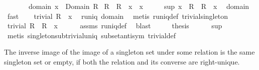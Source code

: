 \begin{isabellebody}
\ \ \ \ \ \ \ domain{\isacharcolon}\ {\isachardoublequoteopen}x\ {\isasymin}\ Domain\ R{\isachardoublequoteclose}\isanewline
{}\ {\isachardoublequoteopen}R{\isasyminverse}\ {\isacharbackquote}{\isacharbackquote}\ R\ {\isacharbackquote}{\isacharbackquote}\ {\isacharbraceleft}x{\isacharbraceright}\ {\isacharequal}\ {\isacharbraceleft}x{\isacharbraceright}{\isachardoublequoteclose}\isanewline
%
\isadelimproof
%
\endisadelimproof
%
\isatagproof
{}\isamarkupfalse%
\ {\isacharminus}\isanewline
\ \ \isamarkupfalse%
\ sup{\isacharcolon}\ {\isachardoublequoteopen}{\isacharbraceleft}x{\isacharbraceright}\ {\isasymsubseteq}\ R{\isasyminverse}\ {\isacharbackquote}{\isacharbackquote}\ R\ {\isacharbackquote}{\isacharbackquote}\ {\isacharbraceleft}x{\isacharbraceright}{\isachardoublequoteclose}\ \isamarkupfalse%
\ domain\ \isamarkupfalse%
\ fast\isanewline
\ \ \isamarkupfalse%
\ {\isachardoublequoteopen}trivial\ {\isacharparenleft}R\ {\isacharbackquote}{\isacharbackquote}\ {\isacharbraceleft}x{\isacharbraceright}{\isacharparenright}{\isachardoublequoteclose}\ \isamarkupfalse%
\ runiq\ domain\ \isamarkupfalse%
\ {\isacharparenleft}metis\ runiq{\isacharunderscore}def\ trivial{\isacharunderscore}singleton{\isacharparenright}\isanewline
\ \ \isamarkupfalse%
\ \isamarkupfalse%
\ {\isachardoublequoteopen}trivial\ {\isacharparenleft}R{\isasyminverse}\ {\isacharbackquote}{\isacharbackquote}\ R\ {\isacharbackquote}{\isacharbackquote}\ {\isacharbraceleft}x{\isacharbraceright}{\isacharparenright}{\isachardoublequoteclose}\isanewline
\ \ \ \ \isamarkupfalse%
\ assms\ runiq{\isacharunderscore}def\ \isamarkupfalse%
\ blast\isanewline
\ \ \isamarkupfalse%
\ \isamarkupfalse%
\ {\isacharquery}thesis\isanewline
\ \ \ \ \isamarkupfalse%
\ sup\ \isamarkupfalse%
\ {\isacharparenleft}metis\ singleton{\isacharunderscore}sub{\isacharunderscore}trivial{\isacharunderscore}uniq\ subset{\isacharunderscore}antisym\ trivial{\isacharunderscore}def{\isacharparenright}\isanewline
{}\isamarkupfalse%
%
\endisatagproof
{\isafoldproof}%
%
\isadelimproof
%
\endisadelimproof
%
\begin{isamarkuptext}%
The inverse image of the image of a singleton set under some relation is the same
  singleton set or empty, if both the relation and its converse are right-unique.%
\end{isamarkuptext}%

\end{isabellebody}

